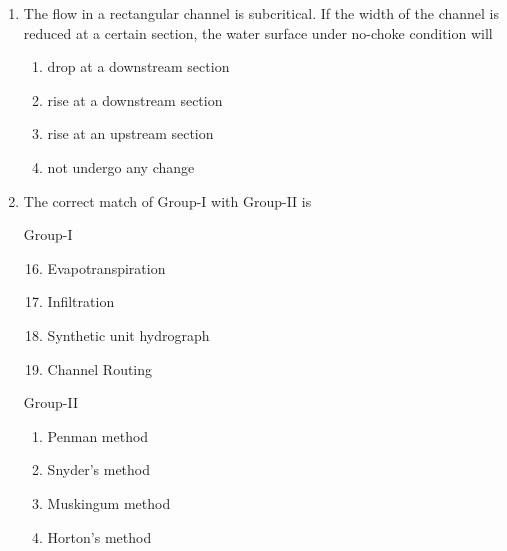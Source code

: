 \documentclass[journal]{IEEEtran}
\begin{document}
\begin{enumerate}
        \begin{multicols}{4}
            \begin{enumerate}
                \item $M_3, S_2$
                \item $M_3, S_3$
                \item $M_2, S_1$
                \item $M_2, S_2$
            \end{enumerate}
        \end{multicols}

    \item The flow in a rectangular channel is subcritical. If the width of the channel is reduced
    at a certain section, the water surface under no-choke condition will  

        \begin{multicols}{2}
            \begin{enumerate}
                \item drop at a downstream section
                \item rise at a downstream section
                \item rise at an upstream section
                \item not undergo any change
            \end{enumerate}
        \end{multicols}
       
    \item The correct match of Group-I with Group-II is
        \begin{multicols}{2}
            Group-I
            \begin{enumerate}[label={\Alph*.}]
                \setcounter{enumii}{15}
                \item Evapotranspiration
                \item Infiltration
                \item Synthetic unit hydrograph
                \item Channel Routing
            \end{enumerate}
            \columnbreak
            Group-II
            \begin{enumerate}[label={\arabic*.}]
                \item Penman method
                \item Snyder's method
                \item Muskingum method
                \item Horton's method
            \end{enumerate}
        \end{multicols}


\end{enumerate}
\end{document}

